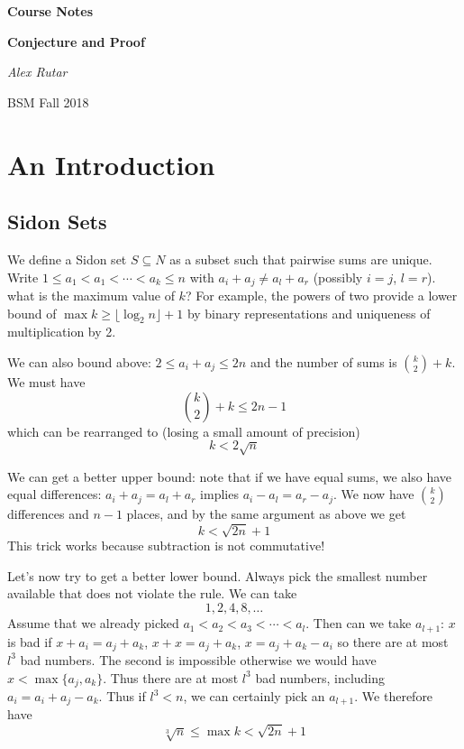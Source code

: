 \documentclass[12pt, a4paper]{book}
\theoremstyle{nonumberplain}
\newcommand{\assignmentname}{Course Notes}
\newcommand{\classname}{Conjecture and Proof}
\newcommand{\semester}{BSM Fall 2018}
\begin{document}
\begin{titlepage}
    \centering
    \vspace{5cm}
    {\huge\textbf{\assignmentname}\par} %
    \vspace{2cm}
    {\Large\textbf{\classname}\par} %
    \vspace{3cm}
    {\Large\textit{Alex Rutar}\par}

    \vfill

    {\large \semester \par} %
\end{titlepage}
{}
\tableofcontents
{}
\chapter{An Introduction}
\section{Sidon Sets}
We define a Sidon set $S\subseteq N$ as a subset such that pairwise sums are unique.
Write $1\leq a_1<a_1<\cdots<a_k\leq n$ with $a_i+a_j\neq a_l+a_r$ (possibly $i=j$, $l=r$).
what is the maximum value of $k$?
For example, the powers of two provide a lower bound of $\max k\geq\lfloor\log_2 n\rfloor+1$ by binary representations and uniqueness of multiplication by 2.

We can also bound above: $2\leq a_i+a_j\leq 2n$ and the number of sums is $\binom{k}{2}+k$.
We must have
\[\binom{k}{2}+k\leq 2n-1\]
which can be rearranged to (losing a small amount of precision)
\[k<2\sqrt{n}\]

We can get a better upper bound: note that if we have equal sums, we also have equal differences: $a_i+a_j=a_l+a_r$ implies $a_i-a_l=a_r-a_j$.
We now have $\binom{k}{2}$ differences and $n-1$ places, and by the same argument as above we get
\[k<\sqrt{2n}+1\]
This trick works because subtraction is not commutative!

Let's now try to get a better lower bound.
Always pick the smallest number available that does not violate the rule.
We can take
\[1,2,4,8,\ldots\]
Assume that we already picked $a_1<a_2<a_3<\cdots<a_l$.
Then can we take $a_{l+1}$: $x$ is bad if $x+a_i=a_j+a_k$, $x+x=a_j+a_k$, $x=a_j+a_k-a_i$ so there are at most $l^3$ bad numbers.
The second is impossible otherwise we would have $x<\max\{a_j,a_k\}$.
Thus there are at most $l^3$ bad numbers, including $a_i=a_i+a_j-a_k$.
Thus if $l^3<n$, we can certainly pick an $a_{l+1}$.
We therefore have
\[\sqrt[3]{n}\leq\max k <\sqrt{2n}+1\]
\end{document}
